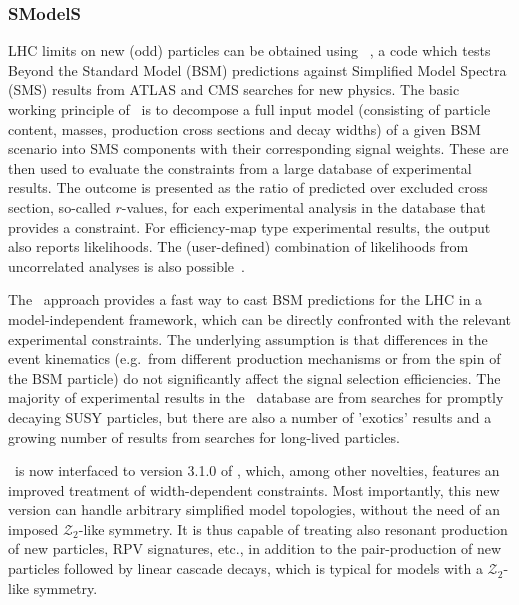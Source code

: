 \documentclass[12pt,a4paper]{article}
\begin{document}
\subsubsection{SModelS}

LHC limits on new (odd) particles can be obtained using \smodels~\cite{Kraml:2013mwa,Ambrogi:2017neo,Ambrogi:2018ujg,Alguero:2021dig,MahdiAltakach:2023bdn}, 
a code which tests Beyond the Standard Model (BSM) predictions against Simplified Model Spectra (SMS) 
results from ATLAS and CMS searches for new physics. 
The basic working principle of \smodels\ is to decompose a full input model (consisting of particle content, masses, production cross sections and decay widths) of a given BSM scenario into SMS components with their corresponding signal weights. 
These are then used to evaluate the constraints from a large database of experimental results. 
The outcome is presented as the ratio of predicted over excluded cross section, so-called $r$-values, for each experimental analysis 
in the database that provides a constraint. For efficiency-map type experimental results, the output also reports likelihoods.  
The (user-defined) combination of likelihoods from uncorrelated analyses is also possible~\cite{MahdiAltakach:2023bdn,Altakach:2023tsd}.

The \smodels\ approach provides a fast way to cast BSM predictions for the LHC in a model-independent framework, which can be directly confronted with the relevant experimental constraints. The underlying assumption is that differences in the event kinematics (e.g.\ from different production mechanisms or from the spin of the BSM particle) do not significantly affect the signal selection efficiencies. 
The majority of experimental results in the \smodels\ database are from searches for promptly decaying SUSY particles, but there are also 
a number of 'exotics' results and a growing number of results from searches for long-lived particles. 

\micro\ is now interfaced to version 3.1.0 of \smodels, which, among other novelties, features an improved treatment of width-dependent constraints. 
Most importantly, this new version can handle arbitrary simplified model topologies, without the need of an imposed $\mathcal{Z}_2$-like symmetry. 
It is thus capable of treating also resonant production of new particles, RPV signatures, etc., in addition to the    
pair-production of new particles followed by linear cascade decays, which is typical for models with a $\mathcal{Z}_2$-like symmetry.
\end{document}
